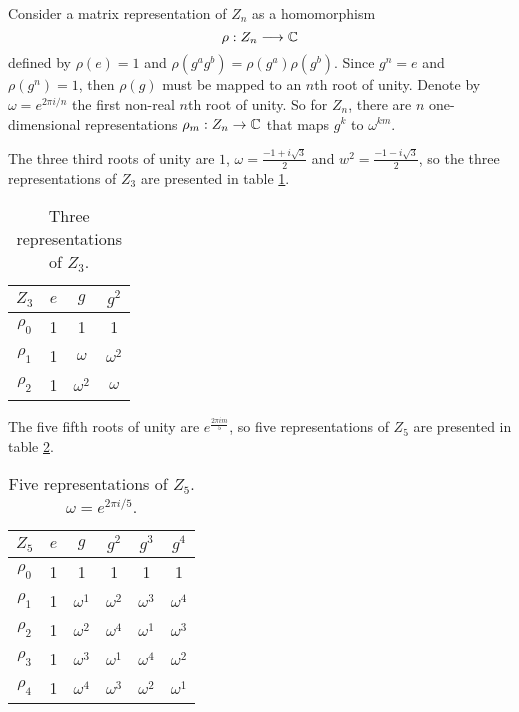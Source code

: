 		Consider a matrix representation of $Z_n$ as a homomorphism
		\[
		\rho: Z_n \longrightarrow \mathbb{C}
		\]
		defined by $\rho(e) = 1$ and $\rho(g^a g^b) = \rho(g^a)\rho(g^b)$. Since $g^n = e$ and $\rho(g^n) = 1$, then $\rho(g)$ must be mapped to an $n$th root of unity. Denote by $\omega = e^{2\pi i/n}$ the first non-real $n$th root of unity. So for $Z_n$, there are $n$ one-dimensional representations $\rho_m: Z_n \rightarrow \mathbb{C}$ that maps $g^k$ to $\omega^{km}$.
		
		\begin{example}[$Z_3$]
			The three third roots of unity are $1$, $\omega = \frac{-1+i\sqrt{3}}{2}$ and $w^2 = \frac{-1-i\sqrt{3}}{2}$, so the three representations of $Z_3$ are presented in table \ref{table:Z3}.
			
			\begin{table}[hbt!]
				\centering
				\caption{Three representations of $Z_3$.}
				\begin{tabular}{c | c c c}
					\label{table:Z3}
					$Z_3$ & $e$ & $g$        & $g^2$      \\ \hline
					$\rho_0$          & 1   & 1          & 1          \\
					$\rho_1$          & 1   & $\omega$   & $\omega^2$ \\
					$\rho_2$          & 1   & $\omega^2$ & $\omega$
				\end{tabular}
			\end{table}
		\end{example}
		
		\begin{example}[$Z_5$]
			The five fifth roots of unity are $e^{\frac{2\pi im}{5}}$, so five representations of $Z_5$ are presented in table \ref{table:Z5}.
			
			\begin{table}[hbt!]
				\centering
				\caption{Five representations of $Z_5$. $\omega = e^{2 \pi i/5}$.}
				\begin{tabular}{c | c c c c c}
					\label{table:Z5}
					$Z_5$ & $e$ & $g$        & $g^2$      & $g^3$      & $g^4$      \\ \hline
					$\rho_0$            & 1   & 1          & 1          & 1          & 1          \\
					$\rho_1$            & 1   & $\omega^1$ & $\omega^2$ & $\omega^3$ & $\omega^4$ \\
					$\rho_2$            & 1   & $\omega^2$ & $\omega^4$ & $\omega^1$ & $\omega^3$ \\
					$\rho_3$            & 1   & $\omega^3$ & $\omega^1$ & $\omega^4$ & $\omega^2$ \\
					$\rho_4$            & 1   & $\omega^4$ & $\omega^3$ & $\omega^2$ & $\omega^1$
				\end{tabular}
			\end{table}
		\end{example}
		
